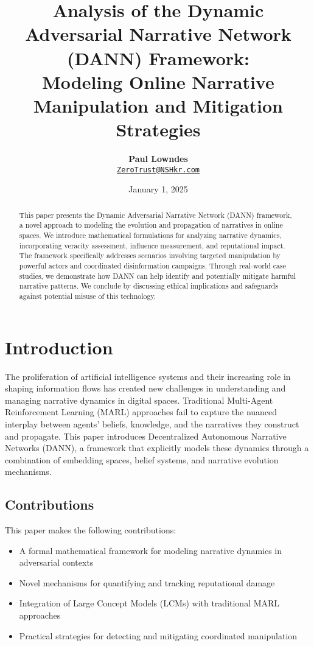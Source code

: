 \documentclass{article}
\title{\vspace{-2cm}\textbf{Analysis of the Dynamic Adversarial Narrative Network (DANN) Framework: \\
Modeling Online Narrative Manipulation and Mitigation Strategies}}
\author{\textbf{Paul Lowndes} \\ \href{mailto:ZeroTrust@NSHkr.com}{\texttt{ZeroTrust@NSHkr.com}}}
\date{\small January 1, 2025}
\begin{document}
\maketitle
\vspace{-1.5em}

\begin{abstract}
This paper presents the Dynamic Adversarial Narrative Network (DANN) framework, a novel approach to modeling the evolution and propagation of narratives in online spaces. We introduce mathematical formulations for analyzing narrative dynamics, incorporating veracity assessment, influence measurement, and reputational impact. The framework specifically addresses scenarios involving targeted manipulation by powerful actors and coordinated disinformation campaigns. Through real-world case studies, we demonstrate how DANN can help identify and potentially mitigate harmful narrative patterns. We conclude by discussing ethical implications and safeguards against potential misuse of this technology.
\end{abstract}

\section{Introduction}
The proliferation of artificial intelligence systems and their increasing role in shaping information flows has created new challenges in understanding and managing narrative dynamics in digital spaces. Traditional Multi-Agent Reinforcement Learning (MARL) approaches fail to capture the nuanced interplay between agents' beliefs, knowledge, and the narratives they construct and propagate. This paper introduces Decentralized Autonomous Narrative Networks (DANN), a framework that explicitly models these dynamics through a combination of embedding spaces, belief systems, and narrative evolution mechanisms.

\subsection{Contributions}
This paper makes the following contributions:
\begin{itemize}
    \item A formal mathematical framework for modeling narrative dynamics in adversarial contexts
    \item Novel mechanisms for quantifying and tracking reputational damage
    \item Integration of Large Concept Models (LCMs) with traditional MARL approaches
    \item Practical strategies for detecting and mitigating coordinated manipulation
\end{itemize}
\end{document}
